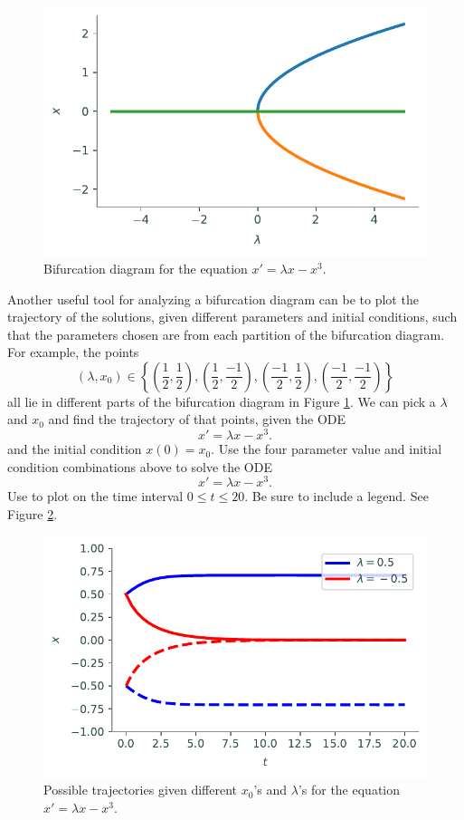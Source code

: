 \begin{figure}[H]
\centering
\includegraphics[width=\textwidth]{figures/prob1.pdf}
\caption{Bifurcation diagram for the equation $x' = \lambda x - x^3$.}
\label{prob1}
\end{figure}

\begin{problem}
Another useful tool for analyzing a bifurcation diagram can be to plot the trajectory of the solutions, given different parameters and initial conditions, such that the parameters chosen are from each partition of the bifurcation diagram. For example, the points
\[(\lambda, x_0)\in \left\{\left(\frac{1}{2},\frac{1}{2}\right), \left(\frac{1}{2},\frac{-1}{2}\right), \left(\frac{-1}{2},\frac{1}{2}\right), \left(\frac{-1}{2},\frac{-1}{2}\right) \right\} \]
all lie in different parts of the bifurcation diagram in Figure \ref{prob1}. We can pick a $\lambda$ and $x_0$ and find the trajectory of that points, given the ODE
\[x' = \lambda x-x^3.\]
and the initial condition $x(0)=x_0$. 
Use the four parameter value and initial condition combinations above to solve the ODE 
\[x' = \lambda x-x^3.\]
Use  to plot on the time interval $0\leq t \leq 20$.
Be sure to include a legend.
See Figure \ref{fig:hysteresis:pitchfork_state_space}.
\end{problem}

\begin{figure}[H]
\centering
\includegraphics[width=\textwidth]{figures/pitchfork_state_space.pdf}
\caption{Possible trajectories given different $x_0$'s and $\lambda$'s for the equation $x' = \lambda x - x^3$.}
\label{fig:hysteresis:pitchfork_state_space}
\end{figure}

